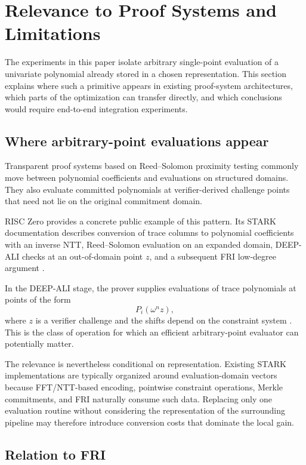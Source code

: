 \section{Relevance to Proof Systems and Limitations}
\label{sec:proof-systems}

The experiments in this paper isolate arbitrary single-point evaluation of a
univariate polynomial already stored in a chosen representation.  This
section explains where such a primitive appears in existing proof-system
architectures, which parts of the optimization can transfer directly, and
which conclusions would require end-to-end integration experiments.

\subsection{Where arbitrary-point evaluations appear}

Transparent proof systems based on Reed--Solomon proximity testing commonly
move between polynomial coefficients and evaluations on structured domains.
They also evaluate committed polynomials at verifier-derived challenge
points that need not lie on the original commitment domain.

RISC Zero provides a concrete public example of this pattern.  Its STARK
documentation describes conversion of trace columns to polynomial
coefficients with an inverse NTT, Reed--Solomon evaluation on an expanded
domain, DEEP-ALI checks at an out-of-domain point \(z\), and a subsequent
FRI low-degree argument \cite{risc0starkbyhand,risc0sequence}.

In the DEEP-ALI stage, the prover supplies evaluations of trace polynomials
at points of the form
\[
P_i(\omega^n z),
\]
where \(z\) is a verifier challenge and the shifts depend on the constraint
system \cite{risc0sequence}.  This is the class of operation for which an
efficient arbitrary-point evaluator can potentially matter.

The relevance is nevertheless conditional on representation.  Existing
STARK implementations are typically organized around evaluation-domain
vectors because FFT/NTT-based encoding, pointwise constraint operations,
Merkle commitments, and FRI naturally consume such data.  Replacing only
one evaluation routine without considering the representation of the
surrounding pipeline may therefore introduce conversion costs that dominate
the local gain.

\subsection{Relation to FRI}

